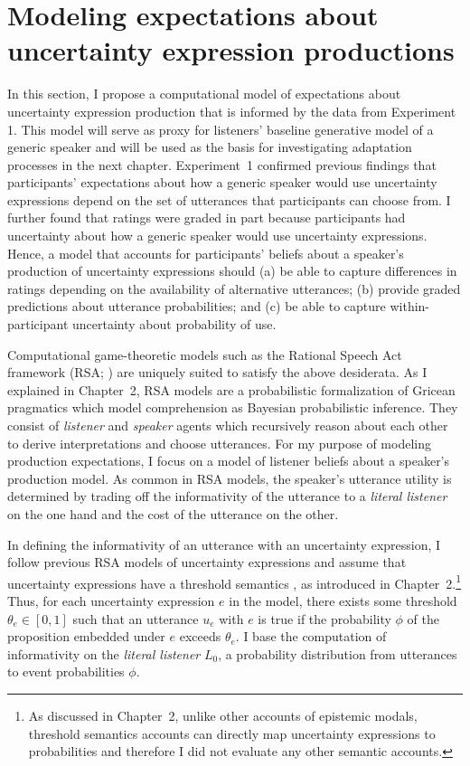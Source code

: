  





\section{Modeling expectations about uncertainty expression productions}
\label{sec:model-baseline}

In this section, I propose a computational model of expectations about uncertainty expression production that is informed by the data from Experiment 1. This model will serve as proxy for listeners' baseline generative model of a generic speaker and will be used as the basis for investigating adaptation processes in the next chapter. Experiment~1 confirmed previous findings that participants' expectations 
about how a generic speaker would use uncertainty expressions 
depend on the set of utterances that participants can choose from.
I further found that ratings were graded in part because participants had uncertainty about how a generic speaker would use uncertainty expressions. 
Hence, a model that accounts for participants' beliefs about a speaker's production of uncertainty expressions
 should  (a) be able to capture differences in ratings depending on the availability of alternative utterances;
(b) provide graded predictions about utterance probabilities; 
and (c) be able to capture within-participant uncertainty about probability of use.

Computational game-theoretic models such as the Rational Speech Act 
framework (RSA; \cite{Goodman2016})  are uniquely suited to satisfy the above desiderata.
As I explained in Chapter~2, RSA models are a probabilistic formalization of Gricean pragmatics which model comprehension as Bayesian probabilistic inference. 
They consist of \textit{listener} and \textit{speaker} agents which recursively reason about each other to derive interpretations and choose utterances. 
For my purpose of modeling production expectations, I focus on a model of listener beliefs about a speaker's production model.
As common in RSA models, the {speaker}'s utterance utility is determined by trading off the informativity of the utterance to a \textit{literal listener} on the one hand and the cost of the utterance on the other.

In defining the informativity of an utterance with an uncertainty expression, I follow previous RSA models of uncertainty expressions \cite{Herbstritt2019}
and assume that uncertainty expressions have a threshold semantics \cite{Swanson2006,Yalcin2010,Lassiter2016}, as introduced in Chapter~2.\footnote{As discussed in Chapter~2, unlike other accounts of epistemic modals, threshold semantics accounts can directly map uncertainty expressions to probabilities and therefore I did not evaluate any other semantic accounts.} Thus, for each uncertainty expression $e$ in the model, there exists some threshold $\theta_e \in [0,1]$ 
such that an utterance $u_e$ with $e$ is true if the probability $\phi$ 
of the proposition embedded under $e$ exceeds $\theta_e$. 
I base the computation of informativity on the \textit{literal listener} $L_0$,  a probability distribution from utterances to event probabilities $\phi$.

